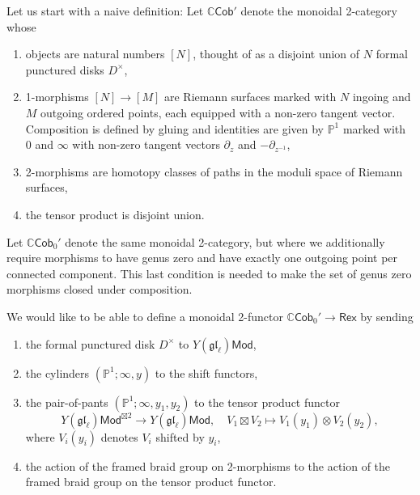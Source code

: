 \documentclass[11pt]{report}
\theoremstyle{definition}
\theoremstyle{remark}
\theoremstyle{remark}
\newcommand{\C}{\mathbb{C}}
\renewcommand{\P}{\mathbb{P}}
\begin{document}
Let us start with a naive definition: Let $\C\mathsf{Cob}'$ denote the monoidal 2-category whose
\begin{enumerate}[label=(\roman*)]
\item objects are natural numbers $[N]$, thought of as a disjoint union of $N$ formal punctured disks $D^\times$,
\item 1-morphisms $[N] \to [M]$ are Riemann surfaces marked with $N$ ingoing and $M$ outgoing ordered points, each equipped with a non-zero tangent vector. Composition is defined by gluing and identities are given by $\P^1$ marked with $0$ and $\infty$ with non-zero tangent vectors $\partial_z$ and $-\partial_{z^{-1}}$,
\item 2-morphisms are homotopy classes of paths in the moduli space of Riemann surfaces,
\item the tensor product is disjoint union.
\end{enumerate}
Let $\C\mathsf{Cob}_0'$ denote the same monoidal 2-category, but where we additionally require morphisms to have genus zero and have exactly one outgoing point per connected component. This last condition is needed to make the set of genus zero morphisms closed under composition.

We would like to be able to define a monoidal 2-functor $\C\mathsf{Cob}_0' \to \mathsf{Rex}$ by sending
\begin{enumerate}[label=(\roman*)]
\item the formal punctured disk $D^\times$ to $Y(\mathfrak{gl}_\ell)\mathsf{Mod}$,
\item the cylinders $(\P^1;\infty,y)$ to the shift functors,
\item the pair-of-pants $(\P^1;\infty,y_1,y_2)$ to the tensor product functor
\begin{equation*}
Y(\mathfrak{gl}_\ell)\mathsf{Mod}^{\boxtimes 2} \to Y(\mathfrak{gl}_\ell)\mathsf{Mod}, \quad V_1 \boxtimes V_2 \mapsto V_1(y_1) \otimes V_2(y_2),
\end{equation*}
where $V_i(y_i)$ denotes $V_i$ shifted by $y_i$,
\item the action of the framed braid group on 2-morphisms to the action of the framed braid group on the tensor product functor.
\end{enumerate}
\end{document}
